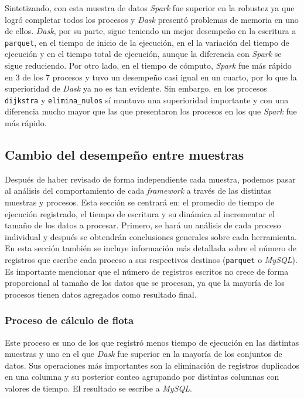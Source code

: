 Sintetizando, con esta muestra de datos \textit{Spark} fue superior en la robustez ya que logró completar todos los procesos y \textit{Dask} presentó problemas de memoria en uno de ellos. \textit{Dask}, por su parte, sigue teniendo un mejor desempeño en la escritura a \texttt{parquet}, en el tiempo de inicio de la ejecución, en el la variación del tiempo de ejecución y en el tiempo total de ejecución, aunque la diferencia con \textit{Spark} se sigue reduciendo. Por otro lado, en el tiempo de cómputo, \textit{Spark} fue más rápido en 3 de los 7 procesos y tuvo un desempeño casi igual en un cuarto, por lo que la superioridad de \textit{Dask} ya no es tan evidente. Sin embargo, en los procesos \texttt{dijkstra} y \texttt{elimina\_nulos} sí mantuvo una superioridad importante y con una diferencia mucho mayor que las que presentaron los procesos en los que \textit{Spark} fue más rápido.


\subsection{Cambio del desempeño entre muestras}
\label{subsection:cambio-muestras-local}

Después de haber revisado de forma independiente cada muestra, podemos pasar al análisis del comportamiento de cada \textit{framework} a través de las distintas muestras y procesos. Esta sección se centrará en: el promedio de tiempo de ejecución registrado, el tiempo de escritura y su dinámica al incrementar el tamaño de los datos a procesar. Primero, se hará un análisis de cada proceso individual y después se obtendrán conclusiones generales sobre cada herramienta. En esta sección también se incluye información más detallada sobre el número de registros que escribe cada proceso a sus respectivos destinos (\texttt{parquet} o \textit{MySQL}). Es importante mencionar que el número de registros escritos no crece de forma proporcional al tamaño de los datos que se procesan, ya que la mayoría de los procesos tienen datos agregados como resultado final.

\subsubsection{Proceso de cálculo de flota}

Este proceso es uno de los que registró menos tiempo de ejecución en las distintas muestras y uno en el que \textit{Dask} fue superior en la mayoría de los conjuntos de datos. Sus operaciones más importantes son la eliminación de registros duplicados en una columna y su posterior conteo agrupando por distintas columnas con valores de tiempo. El resultado se escribe a \textit{MySQL}.

